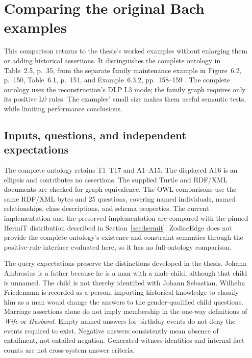 \section{Comparing the original Bach examples}
\label{sec:bach-comparison}

This comparison returns to the thesis's worked examples without enlarging them
or adding historical assertions. It distinguishes the complete ontology in
Table~2.5, p.~35, from the separate family maintenance example in Figure~6.2,
p.~150, Table~6.1, p.~151, and Example~6.3.2, pp.~158--159
\cite{volz2004}. The complete ontology uses the reconstruction's DLP L3 mode;
the family graph requires only its positive L0 rules. The examples' small
size makes them useful semantic tests, while limiting performance conclusions.

\subsection{Inputs, questions, and independent expectations}

The complete ontology retains T1--T17 and A1--A15. The displayed A16 is an
ellipsis and contributes no assertions. The supplied Turtle and RDF/XML
documents are checked for graph equivalence. The OWL comparisons use the same
RDF/XML bytes and 25 questions, covering named individuals, named relationships,
class descriptions, and schema properties. The current implementation and
the preserved  implementation are compared with the pinned
HermiT distribution described in Section~\ref{sec:hermit}. ZodiacEdge does not
provide the complete ontology's existence and constraint semantics through the
positive-rule interface evaluated here, so it has no full-ontology comparison.

The query expectations preserve the distinctions developed in the thesis.
Johann Ambrosius is a father because he is a man with a male child, although
that child is unnamed. The child is not thereby identified with Johann
Sebastian. Wilhelm Friedemann is recorded as a person; importing historical
knowledge to classify him as a man would change the answers to the
gender-qualified child questions. Marriage assertions alone do not imply
membership in the one-way definitions of \emph{Wife} or \emph{Husband}.
Empty named answers for birthday events do not deny the events required to
exist. Negative answers consistently mean absence of entailment, not entailed
negation. Generated witness identities and internal fact counts are not
cross-system answer criteria.

